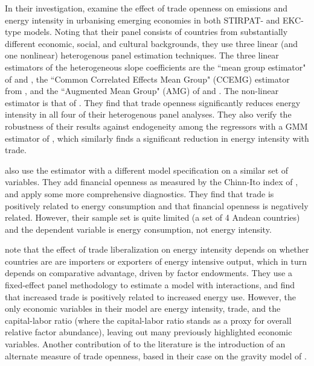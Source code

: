 \documentclass[12pt,a4paper]{article}
\begin{document}
In their investigation, \cite{rafiqUrbanizationOpennessEmissions2016} examine the effect of trade openness on emissions and energy intensity in urbanising emerging economies in both STIRPAT- and EKC-type models.
Noting that their panel consists of countries from substantially different economic, social,
and cultural backgrounds, they use three linear (and one nonlinear) heterogenous panel estimation techniques.
The three linear estimators of the heterogeneous slope coefficients are the ``mean group estimator" of \cite{pesaranRoleEconomicTheory1997} and \cite{pesaranEstimatingLongrunRelationships1995}, the ``Common Correlated Effects Mean Group" (CCEMG) estimator from \cite{pesaranEstimationInferenceLarge2006}, 
and the ``Augmented Mean Group" (AMG) of \cite{eberhardtCrosssectionDependenceNonstationary2009} and \mbox{\cite{eberhardtProductivityAnalysisGlobal2010}}.
The non-linear estimator is that of \cite{kapetaniosNonlinearPanelData2014}.
They find that trade openness significantly reduces energy intensity in all four of their heterogenous panel analyses.
They also verify the robustness of their results against endogeneity among the regressors with a GMM estimator of \cite{arellanoTestsSpecificationPanel1991}, which similarly finds a significant reduction in energy intensity with trade.

\cite{koengkanPositiveImpactTrade2018} also use the \cite{arellanoTestsSpecificationPanel1991} estimator with a different model specification on a similar set of variables.
They add financial openness as measured by the Chinn-Ito index of \citep{chinnWhatMattersFinancial2006}, and apply some more comprehensive diagnostics. 
They find that trade is positively related to energy consumption and that financial openness is negatively related.
However, their sample set is quite limited (a set of 4 Andean countries) and the dependent variable is energy consumption, not energy intensity.

\cite{coleDoesTradeLiberalization2006}\footnotemark{} note that the effect of trade liberalization on energy intensity depends on whether countries are are importers or exporters of energy intensive output, which in turn depends on comparative advantage, driven by factor endowments. 
They use a fixed-effect panel methodology to estimate a model with interactions, and find that increased trade is positively related to increased energy use.
However, the only economic variables in their model are energy intensity, trade, and the capital-labor ratio (where the capital-labor ratio stands as a proxy for overall relative factor abundance), leaving out many previously highlighted economic variables.
Another contribution of \cite{coleDoesTradeLiberalization2006} to the literature is the introduction of an alternate measure of trade openness, based in their case on the gravity model of \cite{frankelEstimateEffectCommon2002}.
\end{document}
